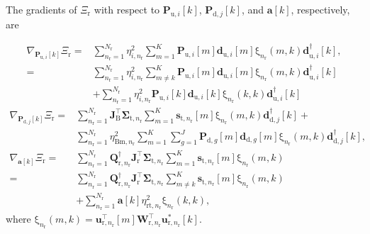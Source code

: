 \documentclass[10pt,journal]{IEEEtran}
\newcommand{\paren}[1]{\left({#1}\right)}
\newcommand{\bracket}[1]{{\left [{#1}\right ]}}
\newcommand{\rr}{_\mathrm{r}}
\newcommand{\rnr}{_{\mathrm{r},n_\mathrm{r}}}
\newcommand{\target}{\mathrm{t}}
\newcommand{\sigmanr}{\boldsymbol{\Sigma}_{\textrm{t},n\rr}}
\newcommand{\PiB}{\mathbf{P}_{\textrm{u},i}\bracket{k}}
\newcommand{\PBj}{\mathbf{P}_{\textrm{d},j}\bracket{k}}
\theoremstyle{definition}
\begin{document}
{The gradients of $\Xi_{\text{r}}$ with respect to $\PiB$, $\PBj$, and $\mathbf{a}\bracket{k}$, respectively, are \par\noindent\small
\begin{align}
\nabla_{\PiB}\Xi_{\text{r}}=&\sum_{n\rr=1}^{\mathit{N}\rr}\eta^2_{i,n\rr}\sum_{m=1}^{\mathrm{\mathit{K}}}\mathbf{P}_{\textrm{u},i}\bracket{m}\mathbf{d}_{\textrm{u},i}\bracket{m}\mathrm{\xi}_{n\rr}\paren{m,k}\mathbf{d}^\dagger_{\textrm{u},i}\bracket{k},\nonumber\\
=&\sum_{n\rr=1}^{\mathit{N}\rr}\eta^2_{i,n\rr}\sum_{m\neq k}^{\mathrm{\mathit{K}}}\mathbf{P}_{\textrm{u},i}\bracket{m}\mathbf{d}_{\textrm{u},i}\bracket{m}\mathrm{\xi}_{n\rr}\paren{m,k}\mathbf{d}^\dagger_{\textrm{u},i}\bracket{k}\nonumber\\
&+\sum_{n\rr=1}^{\mathit{N}\rr}\eta^2_{i,n\rr}\mathbf{P}_{\textrm{u},i}\bracket{k}\mathbf{d}_{\textrm{u},i}\bracket{k}\mathrm{\xi}_{n\rr}\paren{k,k}\mathbf{d}^\dagger_{\textrm{u},i}\bracket{k}\nonumber
\end{align}
\begin{align}
\nabla_{\PBj}\Xi_{\text{r}}
=&\sum_{n\rr=1}^{\mathit{N}\rr}\mathbf{J}^\top_{\textrm{B}}\sigmanr\sum_{m=1}^{\mathrm{\mathit{K}}}\mathbf{s}_{\target,n\rr}\bracket{m}\mathrm{\xi}_{n\rr}\paren{m,k}\mathbf{d}^\dagger_{\textrm{d},j}\bracket{k}+\nonumber\\
&\sum_{n\rr=1}^{\mathit{N}\rr}\eta^2_{\textrm{Bm},n\rr}\sum_{m=1}^{\mathrm{\mathit{K}}}\sum_{g=1}^{\mathit{J}}\mathbf{P}_{\textrm{d},g}\bracket{m}\mathbf{d}_{\textrm{d},g}\bracket{m}\mathrm{\xi}_{n\rr}\paren{m,k}\mathbf{d}^\dagger_{\textrm{d},j}\bracket{k},\nonumber\\
\nabla_{\mathbf{a}\bracket{k}}\Xi_{\text{r}}=& \sum_{n\rr=1}^{\mathit{N}\rr}\mathbf{Q}^\dagger\rnr\mathbf{J}^\top_{\textrm{r}}\sigmanr\sum_{m=1}^{\mathrm{\mathit{K}}}\mathbf{s}_{\target,n\rr}\bracket{m}\mathrm{\xi}_{n\rr}\paren{m,k}\nonumber\\
=&\sum_{n\rr=1}^{\mathit{N}\rr}\mathbf{Q}^\dagger\rnr\mathbf{J}^\top_{\textrm{r}}\sigmanr\sum_{m\neq k}^{\mathrm{\mathit{K}}}\mathbf{s}_{\target,n\rr}\bracket{m}\mathrm{\xi}_{n\rr}\paren{m,k}\nonumber\\
&+\sum_{n\rr=1}^{\mathit{N}\rr}\mathbf{a}\bracket{k}\eta^2_{\textrm{rt},n\rr}\mathrm{\xi}_{n\rr}\paren{k,k},\nonumber
\end{align}\normalsize
where  $\mathrm{\xi}_{n\rr}\paren{m,k}=\mathbf{u}^\top_{\textrm{r},n\rr}\bracket{m}\mathbf{W}^\top\rnr\mathbf{u}^\ast_{\textrm{r},n\rr}\bracket{k}$.
}
\end{document}
